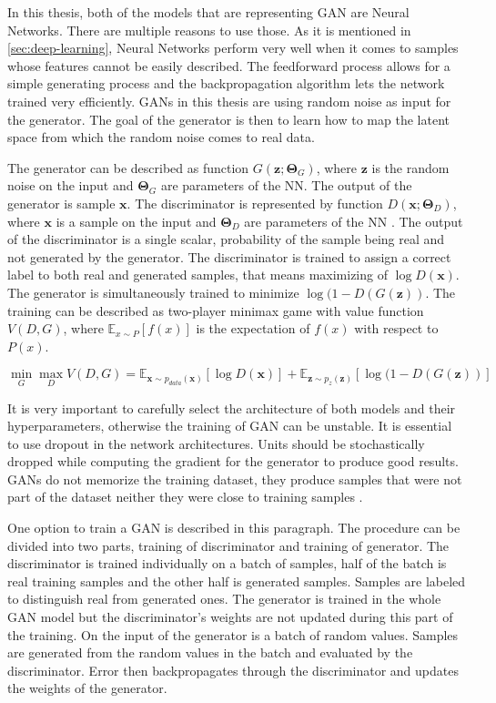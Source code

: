 In this thesis, both of the models that are representing GAN are Neural Networks. There are multiple reasons to use those. As it is mentioned in \autoref{sec:deep-learning}, Neural Networks perform very well when it comes to samples whose features cannot be easily described. The feedforward process allows for a simple generating process and the backpropagation algorithm lets the network trained very efficiently. GANs in this thesis are using random noise as input for the generator. The goal of the generator is then to learn how to map the latent space from which the random noise comes to real data.

The generator can be described as function $G(\pmb z; \pmb \Theta_G)$, where $\pmb z$ is the random noise on the input and $\pmb \Theta_G$ are parameters of the NN. The output of the generator is sample $\pmb x$. The discriminator is represented by function $D(\pmb x; \pmb \Theta_D)$, where $\pmb x$ is a sample on the input and $\pmb \Theta_D$ are parameters of the NN \cite{NIPS2014_5423}. The output of the discriminator is a single scalar, probability of the sample being real and not generated by the generator. The discriminator is trained to assign a correct label to both real and generated samples, that means maximizing of $\log D(\pmb x)$. The generator is simultaneously trained to minimize $\log (1 - D(G(\pmb z))$. The training can be described as two-player minimax game with value function $V(D, G)$, where $\mathbb{E}_{x \sim P} [f(x)]$ is the expectation of $f(x)$ with respect to $P(x)$.

$$ \min\limits_G \max\limits_D V(D, G) =
\mathbb{E}_{\pmb x \sim p_{data} (\pmb x)}[\log D(\pmb x)] +
\mathbb{E}_{\pmb z \sim p_{z} (\pmb z)}[\log (1 - D(G(\pmb z))]$$

It is very important to carefully select the architecture of both models and their hyperparameters, otherwise the training of GAN can be unstable. It is essential to use dropout in the network architectures. Units should be stochastically dropped while computing the gradient for the generator to produce good results. GANs do not memorize the training dataset, they produce samples that were not part of the dataset neither they were close to training samples \cite{NIPS2014_5423}.

One option to train a GAN is described in this paragraph. The procedure can be divided into two parts, training of discriminator and training of generator. The discriminator is trained individually on a batch of samples, half of the batch is real training samples and the other half is generated samples. Samples are labeled to distinguish real from generated ones. The generator is trained in the whole GAN model but the discriminator's weights are not updated during this part of the training. On the input of the generator is a batch of random values. Samples are generated from the random values in the batch and evaluated by the discriminator. Error then backpropagates through the discriminator and updates the weights of the generator.

